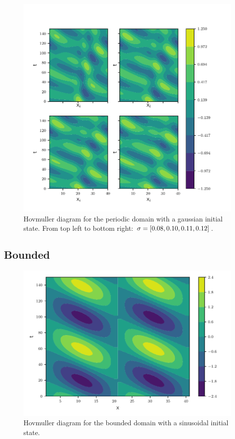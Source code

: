\begin{figure}[htp]
  \centering
  \includegraphics[width=\textwidth]{../figures/hovmuller_sigma.pdf}
  \caption{Hovmuller diagram for the periodic domain with a gaussian initial
  state.
  From top left to bottom right: $\sigma = \left[0.08, 0.10, 0.11, 0.12\right]$.
  }
  \label{fig:periodic_gauss}
\end{figure}



\subsection{Bounded}

\begin{figure}[htp]
  \centering
  \includegraphics[width=\textwidth]{../figures/psi_bounded_centered_sine.pdf}
  \caption{Hovmuller diagram for the bounded domain with a sinusoidal initial
  state.}
  \label{fig:bounded_sine}
\end{figure}


